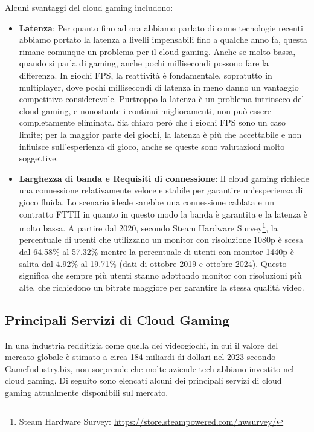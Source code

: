 \documentclass[12pt,a4paper,openright,twoside]{book}
\begin{document}
Alcuni svantaggi del cloud gaming includono:
\begin{itemize}
    \item \textbf{Latenza}: Per quanto fino ad ora abbiamo parlato di come tecnologie recenti abbiamo portato la latenza a livelli impensabili fino a qualche anno fa, questa rimane comunque un problema per il cloud gaming. Anche se molto bassa, quando si parla di gaming, anche pochi millisecondi possono fare la differenza. In giochi \ac{FPS}, la reattività è fondamentale, sopratutto in multiplayer, dove pochi millisecondi di latenza in meno danno un vantaggio competitivo considerevole. Purtroppo la latenza è un problema intrinseco del cloud gaming, e nonostante i continui miglioramenti, non può essere completamente eliminata. Sia chiaro però che i giochi \ac{FPS} sono un caso limite; per la maggior parte dei giochi, la latenza è più che accettabile e non influisce sull'esperienza di gioco, anche se queste sono valutazioni molto soggettive.
    \item \textbf{Larghezza di banda e Requisiti di connessione}: Il cloud gaming richiede una connessione relativamente veloce e stabile per garantire un'esperienza di gioco fluida. Lo scenario ideale sarebbe una connessione cablata e un contratto FTTH in quanto in questo modo la banda è garantita e la latenza è molto bassa. A partire dal 2020, secondo Steam Hardware Survey\footnote{Steam Hardware Survey: \url{https://store.steampowered.com/hwsurvey/}}, la percentuale di utenti che utilizzano un monitor con risoluzione 1080p è scesa dal 64.58\% al 57.32\% mentre la percentuale di utenti con monitor 1440p è salita dal 4.92\% al 19.71\% (dati di ottobre 2019 e ottobre 2024). Questo significa che sempre più utenti stanno adottando monitor con risoluzioni più alte, che richiedono un bitrate maggiore per garantire la stessa qualità video.
\end{itemize}

\subsection{Principali Servizi di Cloud Gaming}
In una industria redditizia come quella dei videogiochi, in cui il valore del mercato globale è stimato a circa 184 miliardi di dollari nel 2023 secondo \href{https://www.gamesindustry.biz/gamesindustrybiz-presents-the-year-in-number-2023}{GameIndustry.biz}, non sorprende che molte aziende tech abbiano investito nel cloud gaming. Di seguito sono elencati alcuni dei principali servizi di cloud gaming attualmente disponibili sul mercato.
\end{document}
